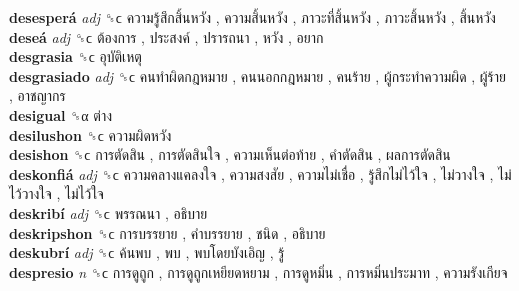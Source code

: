 \textbf{desesperá} \emph{adj}  ␝ϲ   ความรู้สึกสิ้นหวัง ,  ความสิ้นหวัง ,  ภาวะที่สิ้นหวัง ,  ภาวะสิ้นหวัง ,  สิ้นหวัง   \\
\textbf{deseá} \emph{adj}  ␝ϲ   ต้องการ ,  ประสงค์ ,  ปรารถนา ,  หวัง ,  อยาก   \\
\textbf{desgrasia} ␝ϲ   อุบัติเหตุ   \\
\textbf{desgrasiado} \emph{adj}  ␝ϲ   คนทำผิดกฎหมาย ,  คนนอกกฎหมาย ,  คนร้าย ,  ผู้กระทำความผิด ,  ผู้ร้าย ,  อาชญากร   \\
\textbf{desigual} ␝α   ต่าง   \\
\textbf{desilushon} ␝ϲ   ความผิดหวัง   \\
\textbf{desishon} ␝ϲ   การตัดสิน ,  การตัดสินใจ ,  ความเห็นต่อท้าย ,  คำตัดสิน ,  ผลการตัดสิน   \\
\textbf{deskonfiá} \emph{adj}  ␝ϲ   ความคลางแคลงใจ ,  ความสงสัย ,  ความไม่เชื่อ ,  รู้สึกไม่ไว้ใจ ,  ไม่วางใจ ,  ไม่ไว้วางใจ ,  ไม่ไว้ใจ   \\
\textbf{deskribí} \emph{adj}  ␝ϲ   พรรณนา ,  อธิบาย   \\
\textbf{deskripshon} ␝ϲ   การบรรยาย ,  คำบรรยาย ,  ชนิด ,  อธิบาย   \\
\textbf{deskubrí} \emph{adj}  ␝ϲ   ค้นพบ ,  พบ ,  พบโดยบังเอิญ ,  รู้   \\
\textbf{despresio} \emph{n}  ␝ϲ   การดูถูก ,  การดูถูกเหยียดหยาม ,  การดูหมิ่น ,  การหมิ่นประมาท ,  ความรังเกียจ   \\
